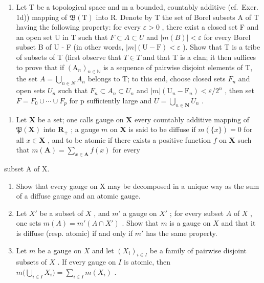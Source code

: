 \begin{enumerate}
\def\labelenumi{\arabic{enumi})}
\setcounter{enumi}{7}
\tightlist
\item
  Let T be a topological space and m a bounded, countably additive (cf.~Exer. 1d)) mapping of \(\mathfrak{B}(\mathrm{T})\) into R. Denote by T the set of Borel subsets A of T having the following property: for every \(\varepsilon > 0\) , there exist a closed set F and an open set U in T such that \(F \subset A \subset U\) and \(|m(B)| < \varepsilon\) for every Borel subset B of U - F (in other words, \(|m|(\mathrm{U} - \mathrm{F}) < \varepsilon\) ). Show that T is a tribe of subsets of T (first observe that \(T \in T\) and that T is a clan; it then suffices to prove that if \((\mathrm{A}_{n})_{n \in \mathbb{N}}\) is a sequence of pairwise disjoint elements of T, the set \(A = \bigcup_{n \in N} A_{n}\) belongs to T; to this end, choose closed sets \(F_{n}\) and open sets \(U_{n}\) such that \(F_{n} \subset A_{n} \subset U_{n}\) and \(|m|(\mathrm{U}_{n} - \mathrm{F}_{n}) < \varepsilon / 2^{n}\) , then set \(F = F_{0} \cup \cdots \cup F_{p}\) for p sufficiently large and \(U = \bigcup_{n \in \mathbf{N}} U_{n}\) .
\end{enumerate}


\begin{enumerate}
\def\labelenumi{\arabic{enumi})}
\setcounter{enumi}{8}
\tightlist
\item
  Let \(\mathbf{X}\) be a set; one calls gauge on \(\mathbf{X}\) every countably additive mapping of \(\mathfrak{P}(\mathbf{X})\) into \(\mathbf{R}_+\) ; a gauge \(m\) on \(\mathbf{X}\) is said to be diffuse if \(m(\{x\}) = 0\) for all \(x \in \mathbf{X}\) , and to be atomic if there exists a positive function \(f\) on \(\mathbf{X}\) such that \(m(\mathbf{A}) = \sum_{x \in \mathbf{A}} f(x)\) for every
\end{enumerate}

subset A of X.

\begin{enumerate}
\def\labelenumi{\alph{enumi})}
\item
  Show that every gauge on X may be decomposed in a unique way as the sum of a diffuse gauge and an atomic gauge.
\item
  Let \(X'\) be a subset of \(X\) , and \(m'\) a gauge on \(X'\) ; for every subset \(A\) of \(X\) , one sets \(m(A) = m'(A \cap X')\) . Show that \(m\) is a gauge on \(X\) and that it is diffuse (resp. atomic) if and only if \(m'\) has the same property.
\item
  Let \(m\) be a gauge on \(X\) and let \((X_i)_{i \in I}\) be a family of pairwise disjoint subsets of \(X\) . If every gauge on \(I\) is atomic, then \(m\big(\bigcup_{i \in I} X_i\big) = \sum_{i \in I} m(X_i)\) .
\end{enumerate}

